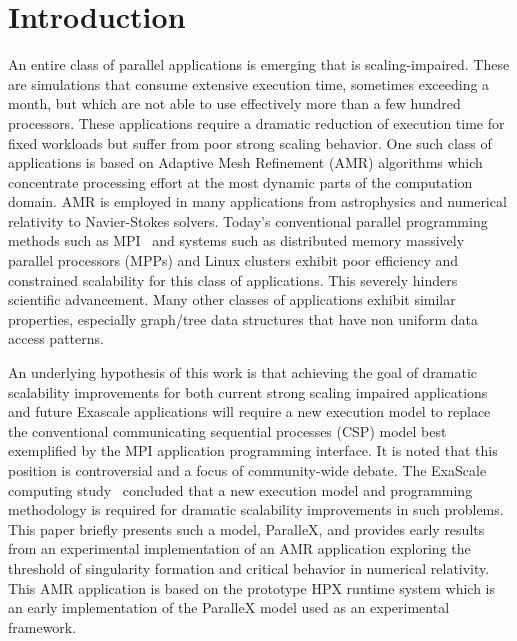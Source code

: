 \documentclass{revtex4}
\begin{document}
\maketitle


\section{Introduction}
An entire class of parallel applications is emerging that is
scaling-impaired. These are simulations that consume extensive
execution time, sometimes exceeding a month, but which are not able to
use effectively more than a few hundred processors.  These applications require a dramatic
reduction of execution time for fixed workloads but suffer from poor strong scaling behavior.
One such class of applications is based on Adaptive Mesh Refinement (AMR) algorithms which
 concentrate processing effort at the most dynamic parts of the computation domain. 
AMR is employed in many applications from astrophysics and numerical relativity to
Navier-Stokes solvers.  Today's conventional parallel programming methods such as 
MPI~\cite{MPISpec} and systems such as distributed memory massively parallel processors (MPPs) and Linux clusters 
exhibit poor efficiency and constrained scalability for this class of applications. 
 This severely hinders scientific advancement.  
Many other classes of applications exhibit similar properties, especially graph/tree 
data structures that have non uniform data access patterns.

An underlying hypothesis of this work is that achieving the goal of
dramatic scalability improvements for both current strong scaling impaired
applications and future Exascale applications will require a new execution model to
replace the conventional communicating sequential processes (CSP) model
best exemplified by the MPI application programming interface. It is
noted that this position is controversial and a focus of community-wide
debate.  The ExaScale computing study~\cite{ExaScale_study} concluded that a new execution model and 
programming methodology is required for dramatic scalability improvements in such problems.
This paper briefly presents such a model, ParalleX, and provides early results 
from an experimental implementation of an AMR application exploring the threshold of 
singularity formation and critical behavior in numerical relativity.  
This AMR application is based on the prototype HPX runtime system which is an early 
implementation of the ParalleX model used as an experimental framework.
\end{document}
